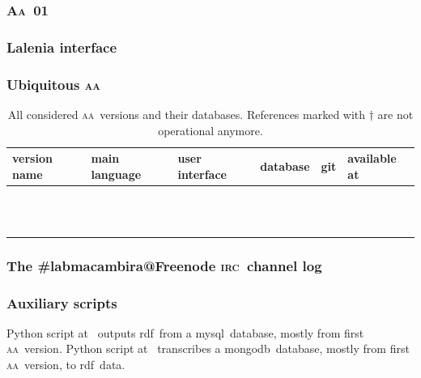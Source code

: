 \documentclass[a4paper, 11pt]{article} %
\newcommand{\irc}{\textsc{irc}}
\newcommand{\aab}{\textsc{aa}}
\newcommand{\aai}{\textsc{Aa}}
\newcommand{\mongodb}{{\sc m}ongo{\sc db}}
\newcommand{\mysql}{{\sc m}y{\sc sql}}
\newcommand{\rdf}{{\sc rdf}}
\begin{document}
\subsubsection{\aai\ 01}\label{sec:aa01}
\subsubsection{Lalenia interface}\label{sec:lalenia}
\subsubsection{Ubiquitous \aab}\label{sec:ubi}

\begin{table}[!h]
  \centering
  \caption{All considered \aab\ versions and their databases. References marked with $\dagger$ are not operational anymore.}\label{tab:aas}
  \begin{tabular}{|l|l|l|l|l|l|}\hline
      {\bf version name} & {\bf main language} & {\bf user interface} & {\bf database} & {\bf git} & {\bf available at} \\\hline\hline
& & & & & \\\hline
& & & & & \\\hline
& & & & & \\\hline
& & & & & \\\hline
& & & & & \\\hline
& & & & & \\\hline
& & & & & \\\hline
& & & & & \\\hline
& & & & & \\\hline
& & & & & \\\hline
& & & & & \\\hline
& & & & & \\\hline
  \end{tabular}
\end{table}

\subsubsection{The \#labmacambira@Freenode \irc\ channel log}
\subsubsection{Auxiliary scripts}
Python script at~\cite{mysqlTri} outputs \rdf\ from a \mysql\ database, mostly from first \aab\ version.
Python script at~\cite{mongoTri} transcribes a \mongodb\ database, mostly from first \aab\ version, to \rdf\ data.
\end{document}
